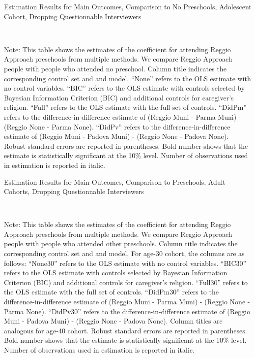 \begin{table}[H] \caption{Estimation Results for Main Outcomes, Comparison to No Preschools, Adolescent Cohort, Dropping Questionnable Interviewers} \label{ols-M-adol-reg-nopres-dropint}
\scalebox{0.8}{}
\vspace{1ex} \\
\footnotesize\raggedright{Note: This table shows the estimates of the coefficient for attending Reggio Approach preschools from multiple methods. We compare Reggio Approach people with people who attended no preschool. Column title indicates the corresponding control set and and model. ``None'' refers to the OLS estimate with no control variables. ``BIC'' refers to the OLS estimate with controls selected by Bayesian Information Criterion (BIC) and additional controls for caregiver's religion. ``Full'' refers to the OLS estimate with the full set of controls. ``DidPm'' refers to the difference-in-difference estimate of (Reggio Muni - Parma Muni) - (Reggio None - Parma None). ``DidPv'' refers to the difference-in-difference estimate of (Reggio Muni - Padova Muni) - (Reggio None - Padova None). Robust standard errors are reported in parentheses. Bold number shows that the estimate is statistically significant at the 10\% level. Number of observations used in estimation is reported in italic.}
\end{table}




\begin{table}[H] \caption{Estimation Results for Main Outcomes, Comparison to Preschools, Adult Cohorts, Dropping Questionnable Interviewers} \label{ols-M-adult-reg-pres-dropint}
\scalebox{0.75}{}
\vspace{1ex} \\
\footnotesize\raggedright{Note: This table shows the estimates of the coefficient for attending Reggio Approach preschools from multiple methods. We compare Reggio Approach people with people who attended other preschools.  Column title indicates the corresponding control set and and model. For age-30 cohort, the columns are as follows: ``None30'' refers to the OLS estimate with no control variables. ``BIC30'' refers to the OLS estimate with controls selected by Bayesian Information Criterion (BIC) and additional controls for caregiver's religion. ``Full30'' refers to the OLS estimate with the full set of controls. ``DidPm30'' refers to the difference-in-difference estimate of (Reggio Muni - Parma Muni) - (Reggio None - Parma None). ``DidPv30'' refers to the difference-in-difference estimate of (Reggio Muni - Padova Muni) - (Reggio None - Padova None).  Column titles are analogous for age-40 cohort. Robust standard errors are reported in parentheses. Bold number shows that the estimate is statistically significant at the 10\% level. Number of observations used in estimation is reported in italic.}
\end{table}

